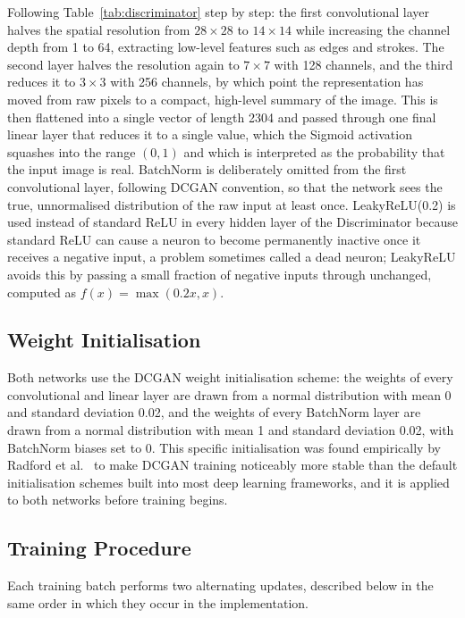 \documentclass[12pt,a4paper]{article}
\begin{document}
Following Table~\ref{tab:discriminator} step by step: the first convolutional layer
halves the spatial resolution from $28 \times 28$ to $14 \times 14$ while increasing the
channel depth from 1 to 64, extracting low-level features such as edges and strokes.
The second layer halves the resolution again to $7 \times 7$ with 128 channels, and the
third reduces it to $3 \times 3$ with 256 channels, by which point the representation has
moved from raw pixels to a compact, high-level summary of the image. This is then
flattened into a single vector of length 2304 and passed through one final linear layer
that reduces it to a single value, which the Sigmoid activation squashes into the range
$(0, 1)$ and which is interpreted as the probability that the input image is real.
BatchNorm is deliberately omitted from the first convolutional layer, following DCGAN
convention, so that the network sees the true, unnormalised distribution of the raw
input at least once. LeakyReLU(0.2) is used instead of standard ReLU in every hidden
layer of the Discriminator because standard ReLU can cause a neuron to become
permanently inactive once it receives a negative input, a problem sometimes called a
dead neuron; LeakyReLU avoids this by passing a small fraction of negative inputs through
unchanged, computed as $f(x) = \max(0.2x, x)$.

\subsection{Weight Initialisation}

Both networks use the DCGAN weight initialisation scheme: the weights of every
convolutional and linear layer are drawn from a normal distribution with mean 0 and
standard deviation 0.02, and the weights of every BatchNorm layer are drawn from a normal
distribution with mean 1 and standard deviation 0.02, with BatchNorm biases set to 0.
This specific initialisation was found empirically by Radford et al.\ \cite{radford2015}
to make DCGAN training noticeably more stable than the default initialisation schemes
built into most deep learning frameworks, and it is applied to both networks before
training begins.

\subsection{Training Procedure}

Each training batch performs two alternating updates, described below in the same order
in which they occur in the implementation.
\end{document}
